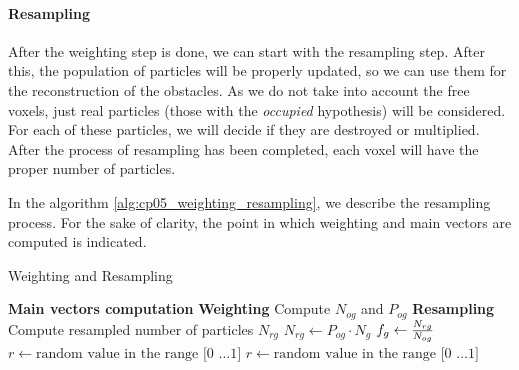 \paragraph{Resampling}\label{ch:chapter05_01_04_02_03}

After the weighting step is done, we can start with the resampling step. After this, the population of particles will be properly updated, so we can use them for the reconstruction of the obstacles. As we do not take into account the free voxels, just real particles (those with the \emph{occupied} hypothesis) will be considered. For each of these particles, we will decide if they are destroyed or multiplied. After the process of resampling has been completed, each voxel will have the proper number of particles.

In the algorithm \ref{alg:cp05_weighting_resampling}, we describe the resampling process. For the sake of clarity, the point in which weighting and main vectors are computed is indicated.

\begin{algorithm}
\caption{Weighting and Resampling}
\label{alg:cp05_weighting_resampling}
\begin{algorithmic}
    \State \textbf{Main vectors computation}
      \State {}
    \State
    \State \textbf{Weighting}
      \State \indent Compute $N_{og}$ and $P_{og}$
      \State
    \State \textbf{Resampling}
      \State \indent Compute resampled number of particles $N_{rg}$
      \State \indent $N_{rg} \gets P_{og} \cdot N_g$
      \State \indent $f_g \gets {{N_{rg}} \over {N_{og}}}$
      \State {}
	 
	 
	\EndFor
	\State $r \gets \text{random value in the range [0 \ldots 1]}$
	\EndIf
      \State {}
      \Else 
	\State $r \gets \text{random value in the range [0 \ldots 1]}$
	\EndIf
      \EndIf
    \EndFor
  \EndFor
\EndFunction
\end{algorithmic}
\end{algorithm}

